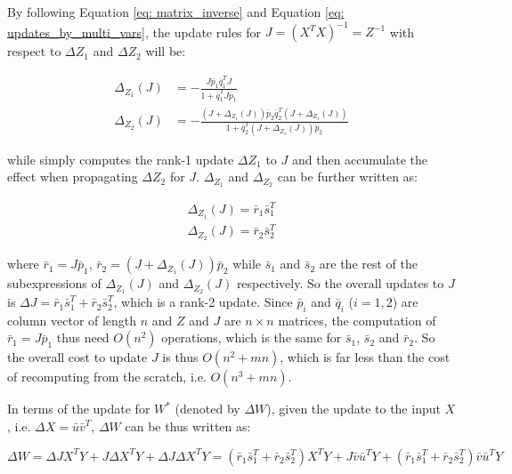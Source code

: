 By following Equation \ref{eq: matrix_inverse} and Equation \ref{eq: updates_by_multi_vars}, the update rules for $J = (X^TX)^{-1} = Z^{-1}$ with respect to $\Delta Z_1$ and $\Delta Z_2$ will be:

\begin{center}
\begin{equation}
\begin{split}
    \Delta_{Z_1}(J)& = -\frac{J\bar{p}_1\bar{q}_1^TJ}{1 + \bar{q}_1^TJ\bar{p}_1}\\
    \Delta_{Z_2}(J)& = -\frac{(J+\Delta_{Z_1}(J))\bar{p}_2\bar{q}_2^T(J+\Delta_{Z_1}(J))}{1 + \bar{q}_2^T(J+\Delta_{Z_1}(J))\bar{p}_2}
\end{split}   
\end{equation}
\end{center}

while simply computes the rank-1 update $\Delta Z_1$ to $J$ and then accumulate the effect when propagating $\Delta Z_2$ for $J$. $\Delta_{Z_1}$ and $\Delta_{Z_2}$ can be further written as:

\begin{equation}
\begin{split}
\Delta_{Z_1}(J) = \bar{r}_1\bar{s}_1^T\\    
\Delta_{Z_2}(J) = \bar{r}_2\bar{s}_2^T
\end{split}
\end{equation}

where $\bar{r}_1 = J\bar{p}_1$, $\bar{r}_2 = (J+\Delta_{Z_1}(J))\bar{p}_2$ while $\bar{s}_1$ and $\bar{s}_2$ are the rest of the subexpressions of $\Delta_{Z_1}(J)$ and $\Delta_{Z_2}(J)$ respectively. So the overall updates to $J$ is $\Delta J = \bar{r}_1\bar{s}_1^T + \bar{r}_2\bar{s}_2^T$, which is a rank-2 update.
Since $\bar{p}_i$ and $\bar{q}_i$ ($i=1,2$) are column vector of length $n$ and $Z$ and $J$ are $n \times n$ matrices, the computation of $\bar{r}_1 =J\bar{p}_1$ thus need $O(n^2)$ operations, which is the same for $\bar{s}_1$, $\bar{s}_2$ and $\bar{r}_2$. So the overall cost to update $J$ is thus $O(n^2 + mn)$, which is far less than the cost of recomputing from the scratch, i.e. $O(n^3 + mn)$.

In terms of the update for $W^*$ (denoted by $\Delta W$), given the update to the input $X$, i.e. $\Delta X=\bar{u}\bar{v}^T$, $\Delta W$ can be thus written as:

\begin{equation}
    \Delta W = \Delta JX^TY + J\Delta X^TY + \Delta J\Delta X^TY = (\bar{r}_1\bar{s}_1^T + \bar{r}_2\bar{s}_2^T)X^TY + J\bar{v}\bar{u}^TY + (\bar{r}_1\bar{s}_1^T + \bar{r}_2\bar{s}_2^T)\bar{v}\bar{u}^TY
\end{equation}

